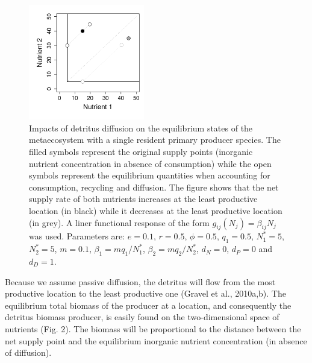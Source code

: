 \documentclass[letterpaper,twocolumn,showkeys]{revtex4-1}
\begin{document}
\begin{figure}[tb]
   \centering
   \includegraphics[width=0.45\textwidth]{DetritusDiffusion.pdf}
   \caption{Impacts of detritus diffusion on the equilibrium states of the metaecosystem with a single resident primary producer species. The filled symbols represent the original supply points (inorganic nutrient concentration in absence of consumption) while the open symbols represent the equilibrium quantities when accounting for consumption, recycling and diffusion. The figure shows that the net supply rate of both nutrients increases at the least productive location (in black) while it decreases at the least productive location (in grey). A liner functional response of the form $g_{ij}(N_{j}) = \beta_{ij}N_j$ was used. Parameters are: $e=0.1$, $r= 0.5$, $\phi=0.5$, $q_1 = 0.5$, $N^*_1=5$, $N^*_2=5$, $m =0.1$, $\beta_1 = mq_1/N^*_1$, $\beta_2 = mq_2/N^*_2$, $d_N = 0$, $d_P = 0$ and $d_D = 1$.
}
   \label{f:Detritus}
\end{figure}

Because we assume passive diffusion, the detritus will flow from the most productive location to the least productive one (Gravel et al., 2010a,b). The equilibrium total biomass of the producer at a location, and consequently the detritus biomass producer, is easily found on the two-dimensional space of nutrients (Fig. 2). The biomass will be proportional to the distance between the net supply point and the equilibrium inorganic nutrient concentration (in absence of diffusion). 
\end{document}
